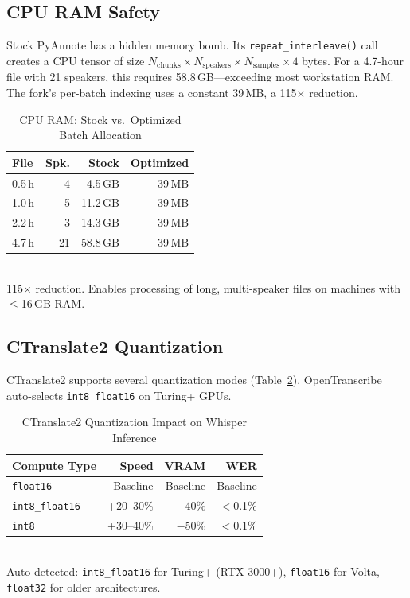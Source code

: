 \documentclass[conference,10pt]{IEEEtran}
\begin{document}
\subsection{CPU RAM Safety}

Stock PyAnnote has a hidden memory bomb. Its
\texttt{repeat\_interleave()} call creates a CPU tensor of size
$N_{\text{chunks}} \times N_{\text{speakers}} \times N_{\text{samples}} \times 4$
bytes. For a 4.7-hour file with 21 speakers, this requires 58.8\,GB---exceeding
most workstation RAM. The fork's per-batch indexing uses a constant 39\,MB,
a 115$\times$ reduction.

\begin{table}[!t]
\centering
\caption{CPU RAM: Stock vs.\ Optimized Batch Allocation}
\label{tab:ramsafety}
\begin{tabular}{@{}lrrr@{}}
\toprule
\textbf{File} & \textbf{Spk.} & \textbf{Stock} & \textbf{Optimized} \\
\midrule
0.5\,h &  4 &  4.5\,GB & 39\,MB \\
1.0\,h &  5 & 11.2\,GB & 39\,MB \\
2.2\,h &  3 & 14.3\,GB & 39\,MB \\
4.7\,h & 21 & 58.8\,GB & 39\,MB \\
\bottomrule
\end{tabular}
\\[4pt]
{\footnotesize 115$\times$ reduction. Enables processing of long, multi-speaker
  files on machines with $\leq$16\,GB RAM.}
\end{table}

\subsection{CTranslate2 Quantization}

CTranslate2 supports several quantization modes (Table~\ref{tab:ctranslate2}).
OpenTranscribe auto-selects \texttt{int8\_float16} on Turing+ GPUs.

\begin{table}[!t]
\centering
\caption{CTranslate2 Quantization Impact on Whisper Inference}
\label{tab:ctranslate2}
\begin{tabular}{@{}lrrr@{}}
\toprule
\textbf{Compute Type} & \textbf{Speed} & \textbf{VRAM} & \textbf{WER} \\
\midrule
\texttt{float16}       & Baseline  & Baseline & Baseline \\
\texttt{int8\_float16} & +20--30\% & $-$40\%  & $<$0.1\% \\
\texttt{int8}          & +30--40\% & $-$50\%  & $<$0.1\% \\
\bottomrule
\end{tabular}
\\[4pt]
{\footnotesize Auto-detected: \texttt{int8\_float16} for Turing+ (RTX 3000+),
  \texttt{float16} for Volta, \texttt{float32} for older architectures.}
\end{table}
\end{document}

